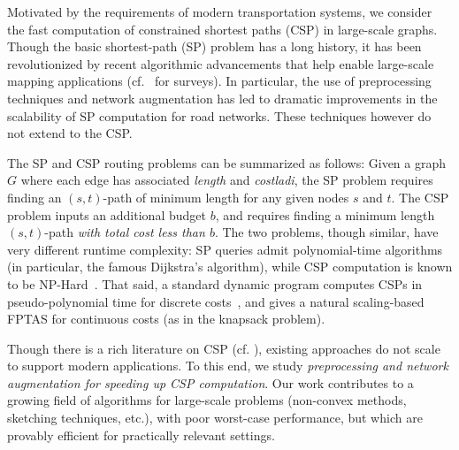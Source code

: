 Motivated by the requirements of modern transportation systems, we consider the fast computation of constrained shortest paths (CSP) in large-scale graphs. Though the basic shortest-path (SP) problem has a long history, it has been revolutionized by recent algorithmic advancements that help enable large-scale mapping applications (cf.~\cite{goldberg_survey,dimacs09} for surveys).
In particular, the use of preprocessing techniques and network augmentation has led to dramatic improvements in the scalability of SP computation for road networks.
These techniques however do not extend to the CSP.

The SP and CSP routing problems can be summarized as follows: Given a graph $G$ where each edge has associated \emph{length} and \emph{costladi}, the SP problem requires finding an $(s,t)$-path of minimum length for any given nodes $s$ and $t$. 
The CSP problem inputs an additional budget $b$, and requires finding a minimum length $(s,t)$-path \emph{with total cost less than $b$}.
The two problems, though similar, have very different runtime complexity: SP queries admit polynomial-time algorithms (in particular, the famous Dijkstra's algorithm), while CSP computation is known to be NP-Hard~\cite{csp_survey}.
That said, a standard dynamic program computes CSPs in pseudo-polynomial time for discrete costs~\cite{alex_bicriteria}, and gives a natural scaling-based FPTAS for continuous costs (as in the knapsack problem).

Though there is a rich literature on CSP (cf. \cite{csp_survey}), existing approaches do not scale to support modern applications. 
To this end, we study \emph{preprocessing and network augmentation for speeding up CSP computation}.
Our work contributes to a growing field of algorithms for large-scale problems (non-convex methods, sketching techniques, etc.), with poor worst-case performance, but which are provably efficient for practically relevant settings.

